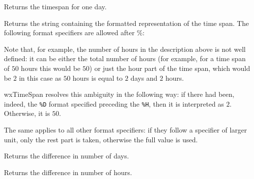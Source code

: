 \label{wxtimespanday}


Returns the timespan for one day.

\label{wxtimespanformat}


Returns the string containing the formatted representation of the time span.
The following format specifiers are allowed after \%:

\twocolwidtha{5cm}%
\begin{twocollist}\itemsep=0pt
\end{twocollist}

Note that, for example, the number of hours in the description above is not
well defined: it can be either the total number of hours (for example, for a
time span of $50$ hours this would be $50$) or just the hour part of the time
span, which would be $2$ in this case as $50$ hours is equal to $2$ days and
$2$ hours.

wxTimeSpan resolves this ambiguity in the following way: if there had been,
indeed, the {\tt \%D} format specified preceding the {\tt \%H}, then it is
interpreted as $2$. Otherwise, it is $50$.

The same applies to all other format specifiers: if they follow a specifier of
larger unit, only the rest part is taken, otherwise the full value is used.

\label{wxtimespangetdays}


Returns the difference in number of days.

\label{wxtimespangethours}


Returns the difference in number of hours.

\label{wxtimespangetmilliseconds}


